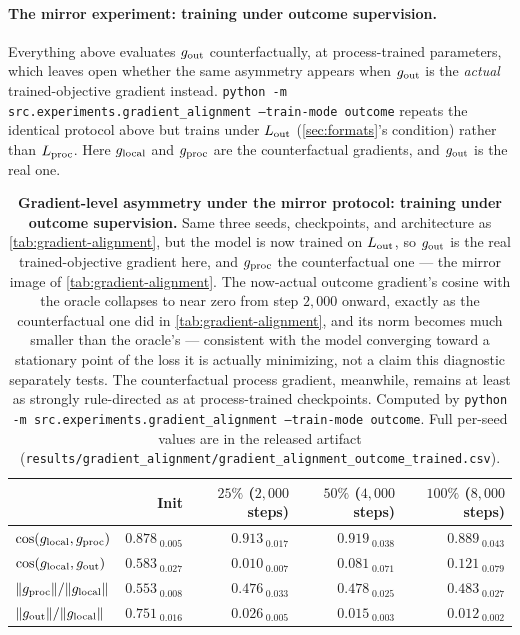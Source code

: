 \paragraph{The mirror experiment: training under outcome supervision.}
Everything above evaluates $g_{\rm out}$ counterfactually, at
process-trained parameters, which leaves open whether the same asymmetry
appears when $g_{\rm out}$ is the \emph{actual} trained-objective
gradient instead. \texttt{python -m src.experiments.gradient\_alignment
--train-mode outcome} repeats the identical protocol above but trains
under $L_{\rm out}$ (\cref{sec:formats}'s \outcome{} condition) rather
than $L_{\rm proc}$. Here $g_{\rm local}$ and $g_{\rm proc}$ are the
counterfactual gradients, and $g_{\rm out}$ is the real one.

\begin{table}[htbp]
\centering
\small
\begin{tabular}{lrrrr}
\toprule
& Init & $25\%$ ($2{,}000$ steps) & $50\%$ ($4{,}000$ steps) & $100\%$ ($8{,}000$ steps)\\
\midrule
$\cos(g_{\rm local},g_{\rm proc})$ & $0.878_{\;0.005}$ & $0.913_{\;0.017}$ & $0.919_{\;0.038}$ & $0.889_{\;0.043}$\\
$\cos(g_{\rm local},g_{\rm out})$ & $0.583_{\;0.027}$ & $0.010_{\;0.007}$ & $0.081_{\;0.071}$ & $0.121_{\;0.079}$\\
\midrule
$\|g_{\rm proc}\|/\|g_{\rm local}\|$ & $0.553_{\;0.008}$ & $0.476_{\;0.033}$ & $0.478_{\;0.025}$ & $0.483_{\;0.027}$\\
$\|g_{\rm out}\|/\|g_{\rm local}\|$ & $0.751_{\;0.016}$ & $0.026_{\;0.005}$ & $0.015_{\;0.003}$ & $0.012_{\;0.002}$\\
\bottomrule
\end{tabular}
\caption{\textbf{Gradient-level asymmetry under the mirror protocol:
training under outcome supervision.} Same three seeds, checkpoints, and
architecture as \cref{tab:gradient-alignment}, but the model is now
trained on $L_{\rm out}$, so $g_{\rm out}$ is the real
trained-objective gradient here, and $g_{\rm proc}$ the counterfactual
one --- the mirror image of \cref{tab:gradient-alignment}. The
now-actual outcome gradient's cosine with the oracle collapses to near
zero from step $2{,}000$ onward, exactly as the counterfactual one did
in \cref{tab:gradient-alignment}, and its norm becomes much smaller than
the oracle's --- consistent with the model
converging toward a stationary point of the loss it is actually
minimizing, not a claim this diagnostic separately tests. The
counterfactual process gradient, meanwhile, remains at least as strongly
rule-directed as at process-trained checkpoints. Computed by
\texttt{python -m src.experiments.gradient\_alignment --train-mode outcome}.
Full per-seed values are in the released artifact
(\texttt{results/gradient\_alignment/gradient\_alignment\_outcome\_trained.csv}).}
\label{tab:gradient-alignment-outcome-trained}
\end{table}

